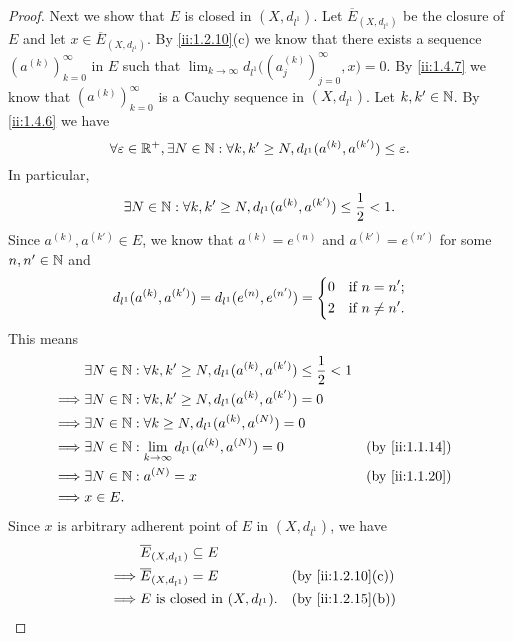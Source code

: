 \begin{proof}
  Next we show that \(E\) is closed in \((X, d_{l^1})\).
  Let \(\overline{E}_{(X, d_{l^1})}\) be the closure of \(E\) and let \(x \in \overline{E}_{(X, d_{l^1})}\).
  By \cref{ii:1.2.10}(c) we know that there exists a sequence \((a^{(k)})_{k = 0}^\infty\) in \(E\) such that \(\lim_{k \to \infty} d_{l^1}\big((a_j^{(k)})_{j = 0}^\infty, x\big) = 0\).
  By \cref{ii:1.4.7} we know that \((a^{(k)})_{k = 0}^\infty\) is a Cauchy sequence in \((X, d_{l^1})\).
  Let \(k, k' \in \mathbb{N}\).
  By \cref{ii:1.4.6} we have
  \[
    \forall \varepsilon \in \mathbb{R}^+, \exists N \in \mathbb{N} : \forall k, k' \geq N, d_{l^1}(a^{(k)}, a^{(k')}) \leq \varepsilon.
  \]
  In particular,
  \[
    \exists N \in \mathbb{N} : \forall k, k' \geq N, d_{l^1}(a^{(k)}, a^{(k')}) \leq \dfrac{1}{2} < 1.
  \]
  Since \(a^{(k)}, a^{(k')} \in E\), we know that \(a^{(k)} = e^{(n)}\) and \(a^{(k')} = e^{(n')}\) for some \(n, n' \in \mathbb{N}\) and
  \[
    d_{l^1}(a^{(k)}, a^{(k')}) = d_{l^1}(e^{(n)}, e^{(n')}) = \begin{dcases}
      0 & \text{if } n = n';    \\
      2 & \text{if } n \neq n'.
    \end{dcases}
  \]
  This means
  \begin{align*}
             & \exists N \in \N : \forall k, k' \geq N, d_{l^1}(a^{(k)}, a^{(k')}) \leq \dfrac{1}{2} < 1                  \\
    \implies & \exists N \in \N : \forall k, k' \geq N, d_{l^1}(a^{(k)}, a^{(k')}) = 0                                    \\
    \implies & \exists N \in \N : \forall k \geq N, d_{l^1}(a^{(k)}, a^{(N)}) = 0                                         \\
    \implies & \exists N \in \N : \lim_{k \to \infty} d_{l^1}(a^{(k)}, a^{(N)}) = 0                      &  & \by{ii:1.1.14} \\
    \implies & \exists N \in \N : a^{(N)} = x                                                            &  & \by{ii:1.1.20} \\
    \implies & x \in E.
  \end{align*}
  Since \(x\) is arbitrary adherent point of \(E\) in \((X, d_{l^1})\), we have
  \begin{align*}
             & \overline{E}_{(X, d_{l^1})} \subseteq E                     \\
    \implies & \overline{E}_{(X, d_{l^1})} = E         &  & \by{ii:1.2.10}[c] \\
    \implies & E \text{ is closed in } (X, d_{l^1}).   &  & \by{ii:1.2.15}[b]
  \end{align*}


\end{proof}
